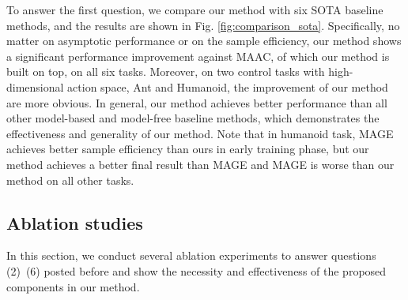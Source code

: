 \documentclass{article} %
\begin{document}


To answer the first question, we compare our method with six SOTA baseline methods, and the results are shown in Fig. \ref{fig:comparison_sota}. Specifically, no matter on asymptotic performance or on the sample efficiency, our method shows a significant performance improvement against MAAC, of which our method is built on top, on all six tasks. Moreover, on two control tasks with high-dimensional action space, Ant and Humanoid, the improvement of our method are more obvious.  In general, our method achieves better performance than all other model-based and model-free baseline methods, which demonstrates the effectiveness and generality of our method. Note that in humanoid task, MAGE  achieves better sample efficiency than ours in early training phase, but our method achieves a better final result than MAGE and MAGE is worse than our method on all other tasks.


\subsection{Ablation studies}

In this section, we conduct several ablation experiments to answer  questions (2)~(6) posted before and show the necessity and effectiveness of the proposed components in our method. %
\end{document}
